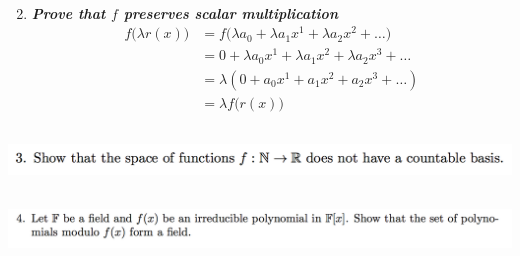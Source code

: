 \documentclass[12pt]{article}
\begin{document}
\begin{mdframed}
\begin{enumerate}
  \begin{align*}
  \end{align*}

\item \textbf{\textit{Prove that $f$ preserves scalar multiplication}}
  \begin{align*}
    f\Big(\lambda r(x)\Big)
    &= f\Big(\lambda a_0 + \lambda a_1x^1 + \lambda a_2x^2 + \ldots \Big) \\
    &= 0 + \lambda a_0x^1 + \lambda a_1x^2 + \lambda a_2x^3 + \ldots \\
    &= \lambda(0 + a_0x^1 + a_1x^2 + a_2x^3 + \ldots) \\
    &= \lambda f\Big(r(x)\Big)
  \end{align*}


\end{enumerate}
\end{mdframed}

\newpage
\subsection*{} %
\includegraphics[width=400pt]{img/linear-algebra-a0-1-3.png}\\
\begin{mdframed}
\end{mdframed}

\subsection*{} %
\includegraphics[width=400pt]{img/linear-algebra-a0-1-4.png}\\
\begin{mdframed}
\end{mdframed}
\end{document}
